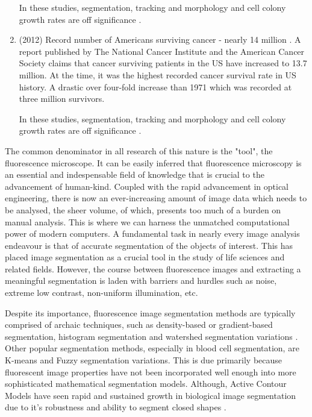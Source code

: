 \begin{enumerate}
	In these studies, segmentation, tracking and morphology and cell colony growth rates are off significance \citep{Hennessy2009,Chin2004,Kallioniemi1992}.

	\item (2012) Record number of Americans surviving cancer - nearly 14 million \citep{MMWR2011}.
	A report published by The National Cancer Institute and the American Cancer Society claims that cancer surviving patients in the US have increased to 13.7 million. At the time, it was the highest recorded cancer survival rate in US history. A drastic over four-fold increase than 1971 which was recorded at three million survivors.
	
	In these studies, segmentation, tracking and morphology and cell colony growth rates are off significance \citep{Chen2006,Yang2005}.
\end{enumerate}

The common denominator in all research of this nature is the "tool", the fluorescence microscope. 
It can be easily inferred that fluorescence microscopy is an essential and indespensable field of knowledge that is crucial to the advancement of human-kind. 
Coupled with the rapid advancement in optical engineering, there is now an ever-increasing amount of image data which needs to be analysed, the sheer volume, of which, presents too much of a burden on manual analysis. 
This is where we can harness the unmatched computational power of modern computers. 
A fundamental task in nearly every image analysis endeavour is that of accurate segmentation of the objects of interest. 
This has placed image segmentation as a crucial tool in the study of life sciences and related fields. 
However, the course between fluorescence images and extracting a meaningful segmentation is laden with barriers and hurdles such as noise, extreme low contrast, non-uniform illumination, etc.

Despite its importance, fluorescence image segmentation methods are typically comprised of archaic techniques, such as density-based or gradient-based segmentation, histogram segmentation and watershed segmentation variations \citep{Volkmann2002,Adiga2003}. Other popular segmentation methods, especially in blood cell segmentation, are K-means and Fuzzy segmentation variations.
This is due primarily because fluorescent image properties have not been incorporated well enough into more sophisticated mathematical segmentation models. Although, Active Contour Models have seen rapid and sustained growth in biological image segmentation due to it's robustness and ability to segment closed shapes \citep{Zimmer2002,Yang2005,Yang2005_2}.


